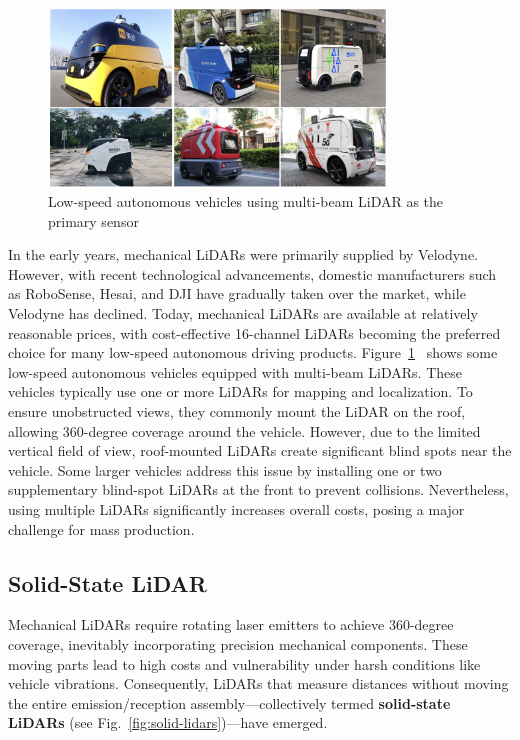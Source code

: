 \begin{figure}[!t]
	\centering
	\includegraphics[width=0.8\textwidth]{resources/3d-lidar-mapping/low-speed-l4-cars.pdf}
	\caption{Low-speed autonomous vehicles using multi-beam LiDAR as the primary sensor}
	\label{fig:low-speed-l4-cars}
\end{figure}

In the early years, mechanical LiDARs were primarily supplied by Velodyne. However, with recent technological advancements, domestic manufacturers such as RoboSense, Hesai, and DJI have gradually taken over the market, while Velodyne has declined. Today, mechanical LiDARs are available at relatively reasonable prices, with cost-effective 16-channel LiDARs becoming the preferred choice for many low-speed autonomous driving products. Figure~\ref{fig:low-speed-l4-cars}~ shows some low-speed autonomous vehicles equipped with multi-beam LiDARs. These vehicles typically use one or more LiDARs for mapping and localization. To ensure unobstructed views, they commonly mount the LiDAR on the roof, allowing 360-degree coverage around the vehicle. However, due to the limited vertical field of view, roof-mounted LiDARs create significant blind spots near the vehicle. Some larger vehicles address this issue by installing one or two supplementary blind-spot LiDARs at the front to prevent collisions. Nevertheless, using multiple LiDARs significantly increases overall costs, posing a major challenge for mass production.

\subsection{Solid-State LiDAR}  
Mechanical LiDARs require rotating laser emitters to achieve 360-degree coverage, inevitably incorporating precision mechanical components. These moving parts lead to high costs and vulnerability under harsh conditions like vehicle vibrations. Consequently, LiDARs that measure distances without moving the entire emission/reception assembly—collectively termed \textbf{solid-state LiDARs} (see Fig.~\ref{fig:solid-lidars})—have emerged.  

